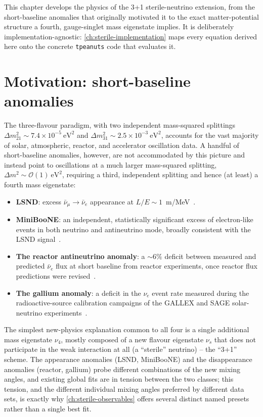 \label{ch:sterile-theory}

This chapter develops the physics of the 3+1 sterile-neutrino extension,
from the short-baseline anomalies that originally motivated it to the exact
matter-potential structure a fourth, gauge-singlet mass eigenstate implies.
It is deliberately implementation-agnostic: \cref{ch:sterile-implementation}
maps every equation derived here onto the concrete \texttt{tpeanuts} code
that evaluates it.

\section{Motivation: short-baseline anomalies}

\begin{theorybox}
The three-flavour paradigm, with two independent mass-squared splittings
$\Delta m^2_{21}\sim7.4\times10^{-5}\ \mathrm{eV^2}$ and
$\Delta m^2_{31}\sim2.5\times10^{-3}\ \mathrm{eV^2}$, accounts for the vast
majority of solar, atmospheric, reactor, and accelerator oscillation data.
A handful of short-baseline anomalies, however, are not accommodated by
this picture and instead point to oscillations at a much larger
mass-squared splitting, $\Delta m^2\sim\mathcal{O}(1)\ \mathrm{eV^2}$,
requiring a third, independent splitting and hence (at least) a fourth mass
eigenstate:
\begin{itemize}
  \item \textbf{LSND}: excess $\bar\nu_\mu\to\bar\nu_e$ appearance at
    $L/E\sim1$~m/MeV~\parencite{Aguilar2001LSND}.
  \item \textbf{MiniBooNE}: an independent, statistically significant
    excess of electron-like events in both neutrino and antineutrino mode,
    broadly consistent with the LSND
    signal~\parencite{AguilarArevalo2018MiniBooNE}.
  \item \textbf{The reactor antineutrino anomaly}: a $\sim6\%$ deficit
    between measured and predicted $\bar\nu_e$ flux at short baseline from
    reactor experiments, once reactor flux predictions were
    revised~\parencite{Mention2011ReactorAnomaly}.
  \item \textbf{The gallium anomaly}: a deficit in the $\nu_e$ event rate
    measured during the radioactive-source calibration campaigns of the
    GALLEX and SAGE solar-neutrino
    experiments~\parencite{GiuntiLaveder2011GalliumAnomaly}.
\end{itemize}
The simplest new-physics explanation common to all four is a single
additional mass eigenstate $\nu_4$, mostly composed of a new flavour
eigenstate $\nu_s$ that does not participate in the weak interaction at
all (a ``sterile'' neutrino) -- the ``3+1'' scheme. The appearance
anomalies (LSND, MiniBooNE) and the disappearance anomalies (reactor,
gallium) probe different combinations of the new mixing angles, and
existing global fits are in tension between the two classes; this tension,
and the different individual mixing angles preferred by different
data sets, is exactly why \cref{ch:sterile-observables} offers several
distinct named presets rather than a single best fit.
\end{theorybox}

